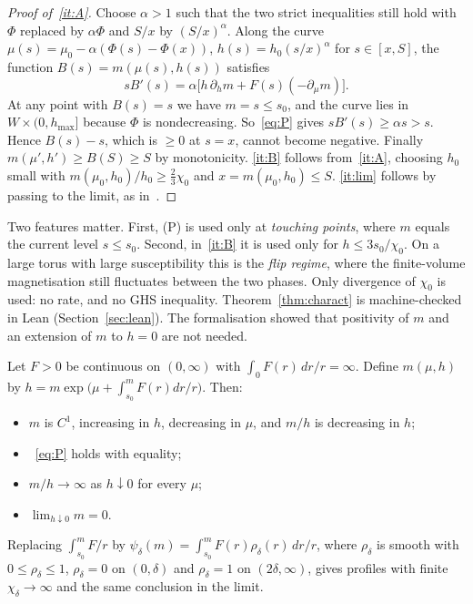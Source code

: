 \begin{proof}[Proof of~\ref{it:A}]
Choose $\alpha>1$ such that the two strict inequalities still hold with $\Phi$ replaced by $\alpha\Phi$ and $S/x$ by $(S/x)^\alpha$. Along the curve $\mu(s)=\mu_0-\alpha(\Phi(s)-\Phi(x))$, $h(s)=h_0(s/x)^\alpha$ for $s\in[x,S]$, the function $B(s)=m(\mu(s),h(s))$ satisfies
\[
sB'(s)=\alpha\big[h\,\partial_hm+F(s)(-\partial_\mu m)\big].
\]
At any point with $B(s)=s$ we have $m=s\le s_0$, and the curve lies in $W\times(0,h_{\max}]$ because $\Phi$ is nondecreasing. So~\eqref{eq:P} gives $sB'(s)\ge\alpha s>s$. Hence $B(s)-s$, which is $\ge0$ at $s=x$, cannot become negative. Finally $m(\mu',h')\ge B(S)\ge S$ by monotonicity. \ref{it:B} follows from~\ref{it:A}, choosing $h_0$ small with $m(\mu_0,h_0)/h_0\ge\frac23\chi_0$ and $x=m(\mu_0,h_0)\le S$. \ref{it:lim} follows by passing to the limit, as in~\cite{ABF87}.
\end{proof}

Two features matter. First, (P) is used only at \emph{touching points}, where $m$ equals the current level $s\le s_0$. Second, in~\ref{it:B} it is used only for $h\le 3s_0/\chi_0$. On a large torus with large susceptibility this is the \emph{flip regime}, where the finite-volume magnetisation still fluctuates between the two phases. Only divergence of $\chi_0$ is used: no rate, and no GHS inequality. Theorem~\ref{thm:charact} is machine-checked in Lean (Section~\ref{sec:lean}). The formalisation showed that positivity of $m$ and an extension of $m$ to $h=0$ are not needed.

\begin{proposition}\label{prop:sharp}
Let $F>0$ be continuous on $(0,\infty)$ with $\int_0F(r)\,dr/r=\infty$. Define $m(\mu,h)$ by $h=m\exp\big(\mu+\int_{s_0}^mF(r)dr/r\big)$. Then:
\begin{itemize}
\item $m$ is $C^1$, increasing in $h$, decreasing in $\mu$, and $m/h$ is decreasing in $h$;
\item~\eqref{eq:P} holds with equality;
\item $m/h\to\infty$ as $h\downarrow0$ for every $\mu$;
\item $\lim_{h\downarrow0}m=0$.
\end{itemize}
Replacing $\int_{s_0}^m F/r$ by $\psi_\delta(m)=\int_{s_0}^m F(r)\rho_\delta(r)\,dr/r$, where $\rho_\delta$ is smooth with $0\le\rho_\delta\le1$, $\rho_\delta=0$ on $(0,\delta)$ and $\rho_\delta=1$ on $(2\delta,\infty)$, gives profiles with finite $\chi_\delta\to\infty$ and the same conclusion in the limit.
\end{proposition}

